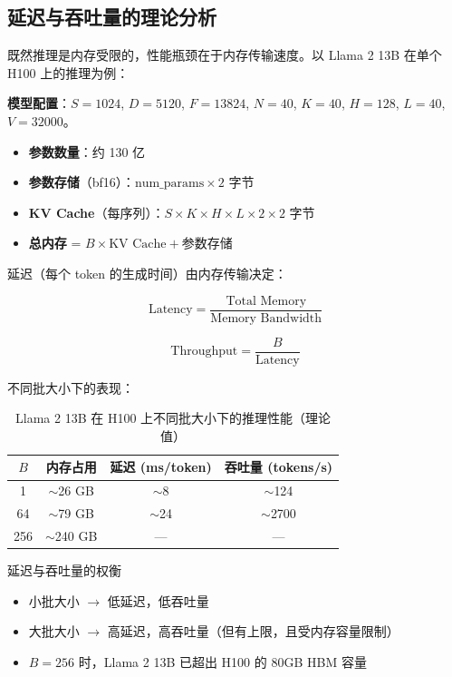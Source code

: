 \subsection{延迟与吞吐量的理论分析}

既然推理是内存受限的，性能瓶颈在于内存传输速度。以 Llama 2 13B 在单个 H100 上的推理为例：

\textbf{模型配置}：$S=1024$, $D=5120$, $F=13824$, $N=40$, $K=40$, $H=128$, $L=40$, $V=32000$。

\begin{itemize}
    \item \textbf{参数数量}：约 130 亿
    \item \textbf{参数存储}（bf16）：$\text{num\_params} \times 2$ 字节
    \item \textbf{KV Cache}（每序列）：$S \times K \times H \times L \times 2 \times 2$ 字节
    \item \textbf{总内存} = $B \times \text{KV Cache} + \text{参数存储}$
\end{itemize}

延迟（每个 token 的生成时间）由内存传输决定：

$$\text{Latency} = \frac{\text{Total Memory}}{\text{Memory Bandwidth}}$$

$$\text{Throughput} = \frac{B}{\text{Latency}}$$

不同批大小下的表现：

\begin{table}[H]
\centering
\begin{tabular}{cccc}
\toprule
$B$ & 内存占用 & 延迟 (ms/token) & 吞吐量 (tokens/s) \\
\midrule
1 & $\sim$26 GB & $\sim$8 & $\sim$124 \\
64 & $\sim$79 GB & $\sim$24 & $\sim$2700 \\
256 & $\sim$240 GB & --- & --- \\
\bottomrule
\end{tabular}
\caption{Llama 2 13B 在 H100 上不同批大小下的推理性能（理论值）}
\end{table}

\begin{importantbox}{延迟与吞吐量的权衡}
\begin{itemize}
    \item 小批大小 $\rightarrow$ 低延迟，低吞吐量
    \item 大批大小 $\rightarrow$ 高延迟，高吞吐量（但有上限，且受内存容量限制）
    \item $B=256$ 时，Llama 2 13B 已超出 H100 的 80GB HBM 容量
\end{itemize}
\end{importantbox}

